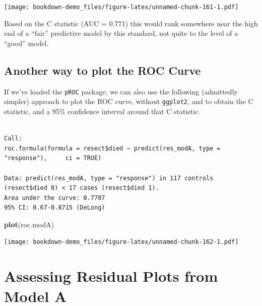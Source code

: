 \documentclass[]{book}
\newenvironment{Shaded}{\begin{snugshade}}{\end{snugshade}}
\newcommand{\KeywordTok}[1]{\textcolor[rgb]{0.13,0.29,0.53}{\textbf{#1}}}
\newcommand{\DataTypeTok}[1]{\textcolor[rgb]{0.13,0.29,0.53}{#1}}
\newcommand{\StringTok}[1]{\textcolor[rgb]{0.31,0.60,0.02}{#1}}
\newcommand{\OtherTok}[1]{\textcolor[rgb]{0.56,0.35,0.01}{#1}}
\newcommand{\OperatorTok}[1]{\textcolor[rgb]{0.81,0.36,0.00}{\textbf{#1}}}
\newcommand{\NormalTok}[1]{#1}
\theoremstyle{definition}
\theoremstyle{definition}
\theoremstyle{definition}
\theoremstyle{remark}
\begin{document}
\texttt{[image: bookdown-demo\_files/figure-latex/unnamed-chunk-161-1.pdf]}

Based on the C statistic (AUC = 0.771) this would rank somewhere near
the high end of a ``fair'' predictive model by this standard, not quite
to the level of a ``good'' model.

\subsection{Another way to plot the ROC
Curve}\label{another-way-to-plot-the-roc-curve}

If we've loaded the \texttt{pROC} package, we can also use the following
(admittedly simpler) approach to plot the ROC curve, without
\texttt{ggplot2}, and to obtain the C statistic, and a 95\% confidence
interval around that C statistic.

\begin{Shaded}
\end{Shaded}

\begin{verbatim}

Call:
roc.formula(formula = resect$died ~ predict(res_modA, type = "response"),     ci = TRUE)

Data: predict(res_modA, type = "response") in 117 controls (resect$died 0) < 17 cases (resect$died 1).
Area under the curve: 0.7707
95% CI: 0.67-0.8715 (DeLong)
\end{verbatim}

\begin{Shaded}
\begin{Highlighting}[]
\KeywordTok{plot}\NormalTok{(roc.modA)}
\end{Highlighting}
\end{Shaded}

\texttt{[image: bookdown-demo\_files/figure-latex/unnamed-chunk-162-1.pdf]}

\section{Assessing Residual Plots from Model
A}\label{assessing-residual-plots-from-model-a}
\end{document}
